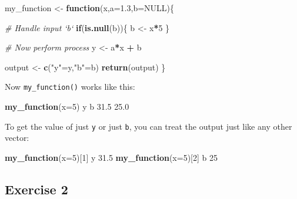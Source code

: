 \documentclass[
]{book}
\newenvironment{Shaded}{\begin{snugshade}}{\end{snugshade}}
\newcommand{\CommentTok}[1]{\textcolor[rgb]{0.56,0.35,0.01}{\textit{#1}}}
\newcommand{\ControlFlowTok}[1]{\textcolor[rgb]{0.13,0.29,0.53}{\textbf{#1}}}
\newcommand{\DataTypeTok}[1]{\textcolor[rgb]{0.13,0.29,0.53}{#1}}
\newcommand{\DecValTok}[1]{\textcolor[rgb]{0.00,0.00,0.81}{#1}}
\newcommand{\FloatTok}[1]{\textcolor[rgb]{0.00,0.00,0.81}{#1}}
\newcommand{\KeywordTok}[1]{\textcolor[rgb]{0.13,0.29,0.53}{\textbf{#1}}}
\newcommand{\NormalTok}[1]{#1}
\newcommand{\OperatorTok}[1]{\textcolor[rgb]{0.81,0.36,0.00}{\textbf{#1}}}
\newcommand{\OtherTok}[1]{\textcolor[rgb]{0.56,0.35,0.01}{#1}}
\newcommand{\StringTok}[1]{\textcolor[rgb]{0.31,0.60,0.02}{#1}}
\begin{document}
\begin{Shaded}
\begin{Highlighting}[]
\NormalTok{my_function <-}\StringTok{ }\ControlFlowTok{function}\NormalTok{(x,}\DataTypeTok{a=}\FloatTok{1.3}\NormalTok{,}\DataTypeTok{b=}\OtherTok{NULL}\NormalTok{)\{}
  
  \CommentTok{# Handle input `b`}
  \ControlFlowTok{if}\NormalTok{(}\KeywordTok{is.null}\NormalTok{(b))\{}
\NormalTok{    b <-}\StringTok{ }\NormalTok{x}\OperatorTok{*}\DecValTok{5}
\NormalTok{  \}}
  
  \CommentTok{# Now perform process}
\NormalTok{  y <-}\StringTok{ }\NormalTok{a}\OperatorTok{*}\NormalTok{x }\OperatorTok{+}\StringTok{ }\NormalTok{b}
  
\NormalTok{  output <-}\StringTok{ }\KeywordTok{c}\NormalTok{(}\StringTok{"y"}\NormalTok{=y,}\StringTok{"b"}\NormalTok{=b) }
  \KeywordTok{return}\NormalTok{(output)}
\NormalTok{\}}
\end{Highlighting}
\end{Shaded}

Now \texttt{my\_function()} works like this:

\begin{Shaded}
\begin{Highlighting}[]
\KeywordTok{my_function}\NormalTok{(}\DataTypeTok{x=}\DecValTok{5}\NormalTok{)}
\NormalTok{   y    b }
\FloatTok{31.5} \FloatTok{25.0} 
\end{Highlighting}
\end{Shaded}

To get the value of just \texttt{y} or just \texttt{b}, you can treat the output just like any other vector:

\begin{Shaded}
\begin{Highlighting}[]
\KeywordTok{my_function}\NormalTok{(}\DataTypeTok{x=}\DecValTok{5}\NormalTok{)[}\DecValTok{1}\NormalTok{]}
\NormalTok{   y }
\FloatTok{31.5} 
\KeywordTok{my_function}\NormalTok{(}\DataTypeTok{x=}\DecValTok{5}\NormalTok{)[}\DecValTok{2}\NormalTok{]}
\NormalTok{ b }
\DecValTok{25} 
\end{Highlighting}
\end{Shaded}

\hypertarget{exercise-2-1}{%
\subsection*{Exercise 2}\label{exercise-2-1}}
\end{document}
